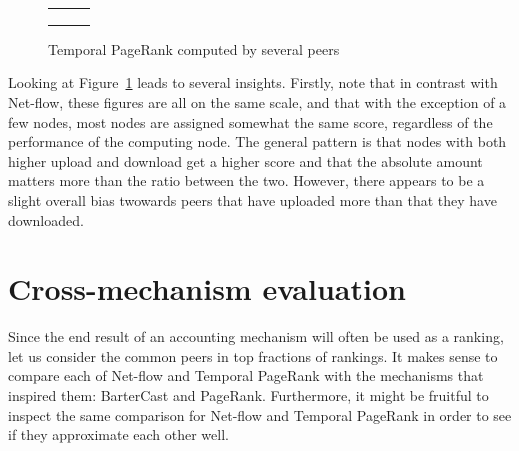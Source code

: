 \documentclass[a4paper,11pt]{book}
\theoremstyle{definition}
\begin{document}
\begin{figure}[ht]
    \centering
    \begin{tabular}[ht]{ccc}
         &
         &
         \\

         &
         &
         \\

         &
         &
         \\

    \end{tabular}
    \caption{Temporal PageRank computed by several peers}
    \label{fig:tpr_per_peer}
\end{figure}

Looking at Figure~\ref{fig:tpr_per_peer} leads to several insights. Firstly, note that
in contrast with Net-flow, these figures are all on the same scale, and that with the
exception of a few nodes, most nodes are assigned somewhat the same score, regardless
of the performance of the computing node. The general pattern is that nodes with both
higher upload and download get a higher score and that the absolute amount matters more
than the ratio between the two. However, there appears to be a slight overall bias
twowards peers that have uploaded more than that they have downloaded.

\section{Cross-mechanism evaluation}

Since the end result of an accounting mechanism will often be used as a ranking, let us
consider the common peers in top fractions of rankings. It makes sense to compare each
of Net-flow and Temporal PageRank with the mechanisms that inspired them: BarterCast
and PageRank. Furthermore, it might be fruitful to inspect the same comparison for
Net-flow and Temporal PageRank in order to see if they approximate each other well.
\end{document}
